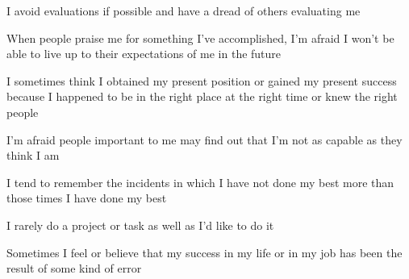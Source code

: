 \documentclass[aspectratio=169]{beamer}
\begin{document}
\begin{frame}
  \begin{center}
    \Huge  I avoid evaluations if possible and have a dread of others evaluating me
  \end{center}
\end{frame}

\begin{frame}
  \begin{center}
    \Huge  When  people  praise  me  for  something  I’ve  accomplished,  I’m  afraid  I  won’t  be able to live up to their expectations of me in the future
  \end{center}
\end{frame}

\begin{frame}
  \begin{center}
    \Huge  I sometimes think I obtained my present position or gained my present success because I happened to be in the right place at the right time or knew the right people
  \end{center}
\end{frame}

\begin{frame}
  \begin{center}
    \Huge  I’m  afraid  people  important  to  me  may  find  out  that  I’m  not  as  capable  as  they  think  I  am
  \end{center}
\end{frame}

\begin{frame}
  \begin{center}
    \Huge I tend to remember the incidents in which I have not done my best more than those times I have done my best
  \end{center}
\end{frame}

\begin{frame}
  \begin{center}
    \Huge  I rarely do a project or task as well as I’d like to do it
  \end{center}
\end{frame}

\begin{frame}
  \begin{center}
    \Huge  Sometimes I feel or believe that my success in my life or in my job has been the result of some kind of error
  \end{center}
\end{frame}
\end{document}
